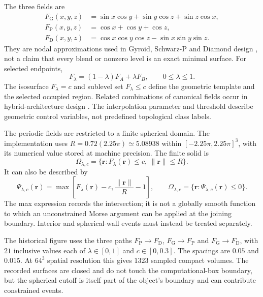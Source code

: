 \documentclass[10pt,twocolumn]{article}
\begin{document}
The three fields are
\begin{equation}
\begin{aligned}
F_{\mathrm G}(x,y,z)&=\sin x\cos y+\sin y\cos z+\sin z\cos x,\\
F_{\mathrm P}(x,y,z)&=\cos x+\cos y+\cos z,\\
F_{\mathrm D}(x,y,z)&=\cos x\cos y\cos z-\sin x\sin y\sin z.
\end{aligned}
\label{suppeq:tpms_fields}
\end{equation}
They are nodal approximations used in Gyroid, Schwarz-P and Diamond design \cite{kg_gado2024tpms}, not a claim that every blend or nonzero level is an exact minimal surface. For selected endpoints,
\begin{equation}
F_\lambda=(1-\lambda)F_A+\lambda F_B,\qquad0\leq\lambda\leq1.
\label{suppeq:tpms_interpolation}
\end{equation}
The isosurface $F_\lambda=c$ and sublevel set $F_\lambda\leq c$ define the geometric template and the selected occupied region. Related combinations of canonical fields occur in hybrid-architecture design \cite{kg_mele2025hybrid_tpms}. The interpolation parameter and threshold describe geometric control variables, not predefined topological class labels.

The periodic fields are restricted to a finite spherical domain. The implementation uses $R=0.72(2.25\pi)\simeq5.08938$ within $[-2.25\pi,2.25\pi]^3$, with its numerical value stored at machine precision. The finite solid is
\begin{equation}
\Omega_{\lambda,c}=\{\mathbf r:F_\lambda(\mathbf r)\leq c,\ \|\mathbf r\|\leq R\}.
\label{suppeq:tpms_compact_solid}
\end{equation}
It can also be described by
\begin{equation}
\Psi_{\lambda,c}(\mathbf r)=\max\!\left[F_\lambda(\mathbf r)-c,\frac{\|\mathbf r\|}{R}-1\right],
\qquad\Omega_{\lambda,c}=\{\mathbf r:\Psi_{\lambda,c}(\mathbf r)\leq0\}.
\end{equation}
The max expression records the intersection; it is not a globally smooth function to which an unconstrained Morse argument can be applied at the joining boundary. Interior and spherical-wall events must instead be treated separately.

The historical figure uses the three paths $F_{\mathrm P}\to F_{\mathrm D}$, $F_{\mathrm G}\to F_{\mathrm P}$ and $F_{\mathrm G}\to F_{\mathrm D}$, with $21$ inclusive values each of $\lambda\in[0,1]$ and $c\in[0,0.3]$. The spacings are $0.05$ and $0.015$. At $64^3$ spatial resolution this gives $1323$ sampled compact volumes. The recorded surfaces are closed and do not touch the computational-box boundary, but the spherical cutoff is itself part of the object's boundary and can contribute constrained events.
\end{document}
